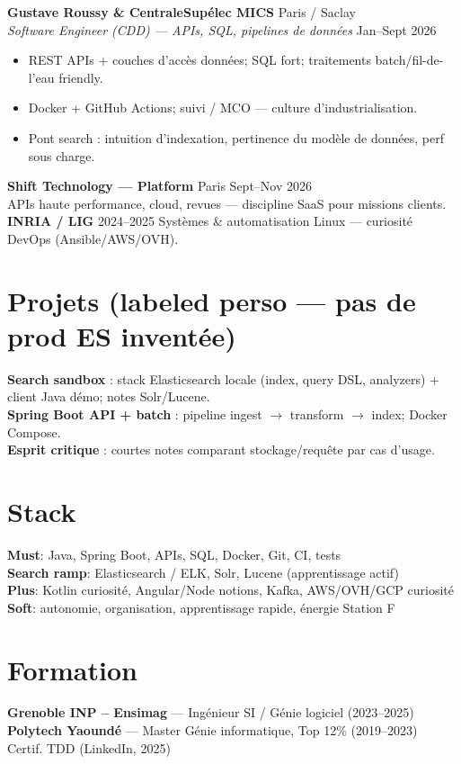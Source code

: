 \documentclass[10pt,a4paper]{article}
\begin{document}
\textbf{Gustave Roussy \& CentraleSup\'elec MICS} \hfill Paris / Saclay\\
\textit{Software Engineer (CDD) --- APIs, SQL, pipelines de donn\'ees} \hfill Jan--Sept 2026
\begin{itemize}
  \item REST APIs + couches d'acc\`es donn\'ees; SQL fort; traitements batch/fil-de-l'eau friendly.
  \item Docker + GitHub Actions; suivi / MCO --- culture d'industrialisation.
  \item Pont search : intuition d'indexation, pertinence du mod\`ele de donn\'ees, perf sous charge.
\end{itemize}

\textbf{Shift Technology --- Platform} \hfill Paris \hfill Sept--Nov 2026\\
APIs haute performance, cloud, revues --- discipline SaaS pour missions clients.\\[2pt]
\textbf{INRIA / LIG} \hfill 2024--2025 \quad Syst\`emes \& automatisation Linux --- curiosit\'e DevOps (Ansible/AWS/OVH).

\section{Projets (labeled perso --- pas de prod ES invent\'ee)}
\textbf{Search sandbox} : stack Elasticsearch locale (index, query DSL, analyzers) + client Java d\'emo; notes Solr/Lucene.\\
\textbf{Spring Boot API + batch} : pipeline ingest $\rightarrow$ transform $\rightarrow$ index; Docker Compose.\\
\textbf{Esprit critique} : courtes notes comparant stockage/requ\^ete par cas d'usage.

\section{Stack}
\textbf{Must}: Java, Spring Boot, APIs, SQL, Docker, Git, CI, tests\\
\textbf{Search ramp}: Elasticsearch / ELK, Solr, Lucene (apprentissage actif)\\
\textbf{Plus}: Kotlin curiosit\'e, Angular/Node notions, Kafka, AWS/OVH/GCP curiosit\'e\\
\textbf{Soft}: autonomie, organisation, apprentissage rapide, \'energie Station F

\section{Formation}
\textbf{Grenoble INP -- Ensimag} --- Ing\'enieur SI / G\'enie logiciel (2023--2025)\\
\textbf{Polytech Yaound\'e} --- Master G\'enie informatique, Top 12\% (2019--2023)\\
Certif. TDD (LinkedIn, 2025)
\end{document}
